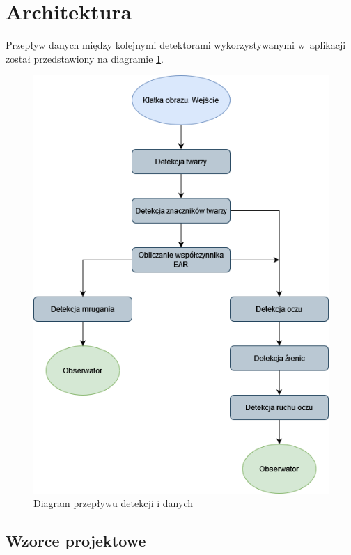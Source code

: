 \newpage
\section{Architektura}

Przepływ danych między kolejnymi detektorami wykorzystywanymi w~aplikacji został przedstawiony na diagramie \ref{fig:architecture}.

\begin{figure}[!h]
    \begin{center}
        \includegraphics[scale=0.5]{img/architecture.png}
        \caption{Diagram przepływu detekcji i danych}
        \label{fig:architecture}
    \end{center}
\end{figure}



\subsection{Wzorce projektowe}

